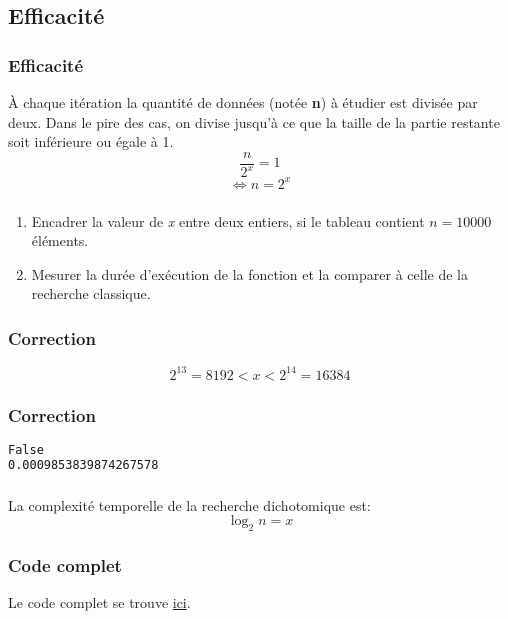 \documentclass[svgnames,11pt]{beamer}
\begin{document}
\subsection{Efficacité}
\begin{frame}
    \frametitle{Efficacité}
    À chaque itération la quantité de données (notée \textbf{n}) à étudier est divisée par deux. Dans le pire des cas, on divise jusqu'à ce que la taille de la partie restante soit inférieure ou égale à 1.
    {\Large$$\dfrac{n}{2^x}=1$$
    $$\Leftrightarrow n=2^x$$}
    

\end{frame}
\begin{frame}
    \frametitle{}

    \begin{activite}
        \begin{enumerate}
            \item Encadrer la valeur de \emph{x} entre deux entiers, si le tableau contient $n=10000$ éléments.
            \item Mesurer la durée d'exécution de la fonction et la comparer à celle de la recherche classique.
        \end{enumerate}
        \end{activite}

\end{frame}
\begin{frame}
    \frametitle{Correction}

    {\Large $$2^{13}=8192 < x < 2^{14}=16384$$}

\end{frame}

\begin{frame}[fragile]
    \frametitle{Correction}

    
\begin{center}
\begin{lstlisting}[language=Bash , basicstyle=\small, xleftmargin=2em, xrightmargin=2em]
False
0.0009853839874267578
\end{lstlisting}
\end{center}
\end{frame}
\begin{frame}
    \frametitle{}

    \begin{aretenir}[]
        La complexité temporelle de la recherche dichotomique est:
        {\Large$$ \log_2{n} =x$$}
        \end{aretenir}
\end{frame}
\begin{frame}
    \frametitle{Code complet}

    Le code complet se trouve \href{https://cviroulaud.github.io/premiere/algorithmique/recherche-dichotomique/scripts/dicho.zip}{ici}.

\end{frame}
\end{document}
